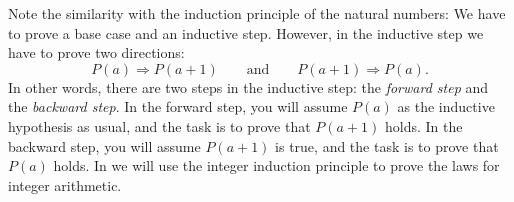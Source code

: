 Note the similarity with the induction principle of the natural numbers: We have to prove a base case and an inductive step. However, in the inductive step we have to prove two directions:
\begin{equation*}
  P(a) \Rightarrow P(a+1)\qquad\text{and}\qquad P(a+1)\Rightarrow P(a).
\end{equation*}
In other words, there are two steps in the inductive step: the \emph{forward step} and the \emph{backward step}. In the forward step, you will assume $P(a)$ as the inductive hypothesis as usual, and the task is to prove that $P(a+1)$ holds. In the backward step, you will assume $P(a+1)$ is true, and the task is to prove that $P(a)$ holds.
In  we will use the integer induction principle to prove the laws for integer arithmetic.

